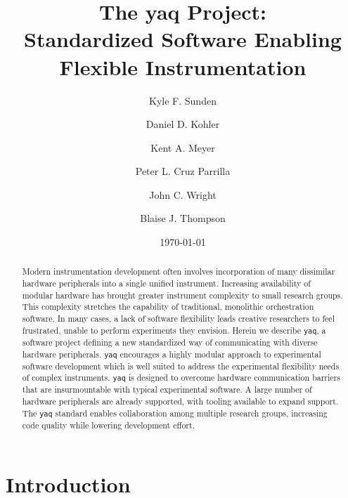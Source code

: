 \documentclass[aip, amsmath, amssymb, reprint,]{revtex4-2}
\newcommand\yaq{\texttt{yaq}}
\begin{document}

\title{The yaq Project: \\ Standardized Software Enabling Flexible Instrumentation}
\author{Kyle F. Sunden}
\author{Daniel D. Kohler}
\author{Kent A. Meyer}
\author{Peter L. Cruz Parrilla}
\author{John C. Wright}
\author{Blaise J. Thompson}

\date{\today}

\begin{abstract}

Modern instrumentation development often involves incorporation of many dissimilar hardware peripherals into a single unified instrument.
Increasing availability of modular hardware has brought greater instrument complexity to small research groups.
This complexity stretches the capability of traditional, monolithic orchestration software.
In many cases, a lack of software flexibility leads creative researchers to feel frustrated, unable to perform experiments they envision.
Herein we describe \yaq{}, a software project defining a new standardized way of communicating with diverse hardware peripherals.
\yaq{} encourages a highly modular approach to experimental software development which is well suited to address the experimental flexibility needs of complex instruments.
\yaq{} is designed to overcome hardware communication barriers that are insurmountable with typical experimental software.
A large number of hardware peripherals are already supported, with tooling available to expand support.
The \yaq{} standard enables collaboration among multiple research groups, increasing code quality while lowering development effort.

\end{abstract}

\maketitle

\section{Introduction}
\end{document}
